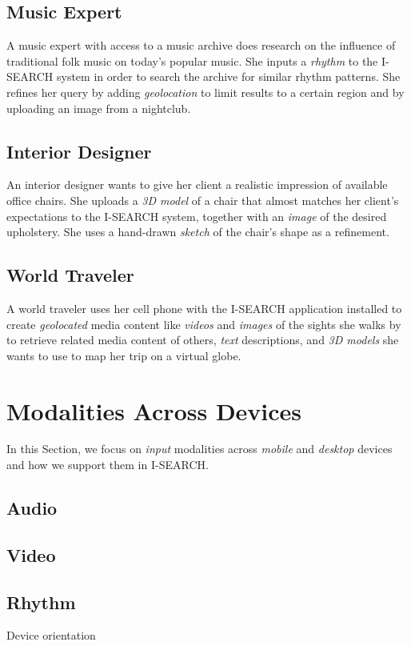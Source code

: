 \documentclass{acm_proc_article-sp}
\let\oldemph\emph
\renewcommand{\emph}[1]{\oldemph{\fontsize{9}{9}\selectfont #1}}
\begin{document}
\subsection{Music Expert}
A music expert with access to a music archive does research on the influence of traditional folk music on today's popular music.
She inputs a \emph{rhythm} to the \mbox{I-SEARCH} system in order to search the archive for similar rhythm patterns.
She refines her query by adding \emph{geolocation} to limit results to a certain region and by uploading an image from a nightclub.

\subsection{Interior Designer}
An interior designer wants to give her client a realistic impression of available office chairs.
She uploads a \emph{3D model} of a chair that almost matches her client's expectations to the \mbox{I-SEARCH} system, together with an \emph{image} of the desired upholstery.
She uses a hand-drawn \emph{sketch} of the chair's shape as a refinement.

\subsection{World Traveler}
A world traveler uses her cell phone with the \mbox{I-SEARCH} application installed to create \emph{geolocated} media content like \emph{videos} and \emph{images} of the sights she walks by to retrieve related media content of others, \emph{text} descriptions, and \emph{3D models} she wants to use to map her trip on a virtual globe.

\section{Modalities Across Devices}
In this Section, we focus on \emph{input} modalities across \emph{mobile} and \emph{desktop} devices and how we support them in \mbox{I-SEARCH}.

\subsection{Audio}
\subsection{Video}
\subsection{Rhythm}
Device orientation~\cite{deviceorientation}
\end{document}
